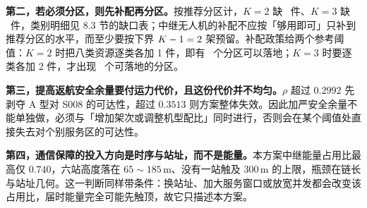 \textbf{第二，若必须分区，则先补配再分区。}按推荐分区计，$K=2$ 缺 \mtQfourGapSum\ 件、$K=3$ 缺 \mtQfourMinPatchKThree\ 件，类别明细见 8.3 节的缺口表；中继无人机的补配不应按「够用即可」只补到推荐分区的水平，而至少要按下界 $K-1=2$ 架预留。补配政策给两个参考阈值：$K=2$ 时把八类资源逐类各加 1 件，即有 \mtQfourThreshKTwoMOne\ 个分区可以落地；$K=3$ 时要逐类各加 2 件，才出现 \mtQfourThreshKThreeMTwo\ 个可落地的分区。

\textbf{第三，提高返航安全余量要付运力代价，且这份代价并不均匀。}$\rho$ 超过 $0.2992$ 先剥夺 A 型对 S008 的可达性，超过 $0.3513$ 则方案整体失效。因此加严安全余量不能单独做，必须与「增加架次或调整机型配比」同时进行，否则会在某个阈值处直接失去对个别服务区的可达性。

\textbf{第四，通信保障的投入方向是时序与站址，而不是能量。}本方案中继能量占用比最高仅 $0.740$，六站高度落在 $65\sim185$\,m、没有一站触及 $300$\,m 的上限，瓶颈在链长与站址几何。这一判断同样带条件：换站址、加大服务窗口或放宽并发都会改变该占用比，届时能量完全可能先触顶，故它只描述本方案。
